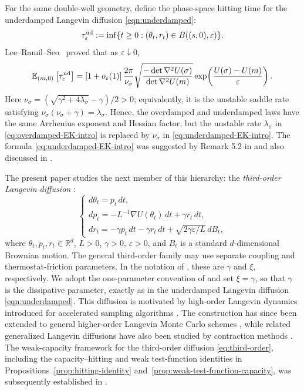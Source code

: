 \documentclass[11pt]{article}
\numberwithin{equation}{section}
\theoremstyle{plain}
\theoremstyle{definition}
\theoremstyle{remark}
\newcommand{\R}{\mathbb R}
\newcommand{\eps}{\varepsilon}
\newcommand{\E}{\mathbb E}
\begin{document}
For the same double-well geometry, define the phase-space hitting time
for the underdamped Langevin diffusion \eqref{eqn:underdamped}:
\[
\tau_\eps^{\rm ud}
:=\inf\{t\ge0:(\theta_t,r_t)\in B((s,0),\eps)\}.
\]
Lee--Ramil--Seo~\cite[Theorem~2.6]{LeeRamilSeo2026} proved that as $\eps\downarrow 0$,
\begin{equation}
\label{eq:underdamped-EK-intro}
\E_{(m,0)}\left[\tau_\eps^{\rm ud}\right]
=
[1+o_\eps(1)]\,
\frac{2\pi}{\nu_\sigma}
\sqrt{\frac{-\det\nabla^2U(\sigma)}{\det\nabla^2U(m)}}
\exp\!\left(\frac{U(\sigma)-U(m)}{\eps}\right).
\end{equation}
Here
$\nu_\sigma=(\sqrt{\gamma^2+4\lambda_\sigma}-\gamma)/2>0$;
equivalently, it is the unstable saddle rate satisfying
$\nu_\sigma(\nu_\sigma+\gamma)=\lambda_\sigma$. Hence, the overdamped and
underdamped laws have the same Arrhenius exponent and Hessian factor, but the
unstable rate $\lambda_\sigma$ in \eqref{eq:overdamped-EK-intro} is replaced
by $\nu_\sigma$ in \eqref{eq:underdamped-EK-intro}.
The formula \eqref{eq:underdamped-EK-intro}
was suggested by Remark 5.2 in \cite{BouchetReygner2016}
and also discussed in \cite{GGZ2}.

The present paper studies the next member of this hierarchy: the \textit{third-order Langevin diffusion} \cite{MouMaWainwrightBartlettJordan2021}:
\begin{equation}
\label{eq:third-order}
\begin{cases}
d\theta_t = p_t\,dt,\\
dp_t = -L^{-1}\nabla U(\theta_t)\,dt+\gamma r_t\,dt,\\
dr_t = -\gamma p_t\,dt-\gamma r_t\,dt+\sqrt{2\gamma\eps/L}\,dB_t,
\end{cases}
\end{equation}
where $\theta_t,p_t,r_t\in\R^d$, $L>0$, $\gamma>0$, $\varepsilon>0$, and $B_t$ is a standard $d$-dimensional Brownian motion.  The general third-order family may use separate coupling and thermostat-friction parameters.  In the notation of \cite{MouMaWainwrightBartlettJordan2021}, these are $\gamma$ and $\xi$, respectively.  We adopt the one-parameter convention of \cite{DangGurbuzbalabanIslamYaoZhu2025} and set $\xi=\gamma$, so that $\gamma$ is the dissipative parameter, exactly as in the underdamped Langevin diffusion \eqref{eqn:underdamped}.  This diffusion is motivated by high-order Langevin dynamics introduced for accelerated sampling algorithms \cite{MouMaWainwrightBartlettJordan2021}.
The construction has since been extended to general higher-order Langevin
Monte Carlo schemes \cite{DangGurbuzbalabanIslamYaoZhu2025,high-order-Liu-2025},
while related generalized Langevin diffusions have also been studied by
contraction methods \cite{Monmarche2023AlmostSure}.
The weak-capacity framework for the third-order diffusion \eqref{eq:third-order}, including the
capacity--hitting and weak test-function identities in
Propositions~\ref{prop:hitting-identity}
and~\ref{prop:weak-test-function-capacity}, was subsequently established in
\cite{HeLiWangZhu2026WeakEquilibrium}.
\end{document}
